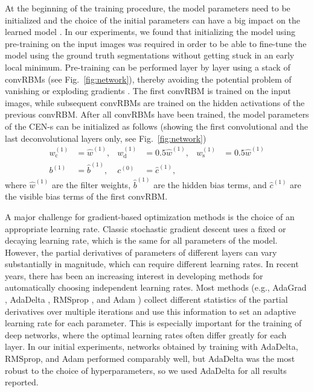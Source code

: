 At the beginning of the training procedure, the model parameters need to be
initialized and the choice of the initial parameters can have a big impact on
the learned model \cite{sutskever2013importance}. In our experiments, we found
that initializing the model using pre-training \cite{Hinton2006} on the input images was required in order
to be able to fine-tune the model using the ground truth segmentations without
getting stuck in an early local minimum. Pre-training can be performed layer by
layer \cite{Hinton2006b} using a stack of convRBMs (see Fig.~\ref{fig:network}),
thereby avoiding the potential problem of vanishing or exploding gradients
\cite{hochreiter1991untersuchungen}. The first convRBM is trained on the input
images, while subsequent convRBMs are trained on the hidden activations of the
previous convRBM. After all convRBMs have been trained, the model parameters of
the CEN-s can be initialized as follows (showing the first convolutional and
the last deconvolutional layers only, see Fig.~\ref{fig:network})
\begin{align}
w_{\text{c}}^{(1)} &= \hat{w}^{(1)}, &
w_{\text{d}}^{(1)} &= 0.5\hat{w}^{(1)}, &
w_{\text{s}}^{(1)} &= 0.5\hat{w}^{(1)} \\
b^{(1)} &= \hat{b}^{(1)}, &
c^{(0)} &= \hat{c}^{(1)},
\end{align}
where $\hat{w}^{(1)}$ are the filter weights, $\hat{b}^{(1)}$ are the hidden
bias terms, and $\hat{c}^{(1)}$ are the visible bias terms of the first convRBM.

A major challenge for gradient-based optimization methods is the choice of an
appropriate learning rate. Classic stochastic gradient descent \cite{LeCun1998}
uses a fixed or decaying learning rate, which is the same for all parameters of
the model. However, the partial derivatives of parameters of different layers
can vary substantially in magnitude, which can require different learning rates.
In recent years, there has been an increasing interest in developing methods for
automatically choosing independent learning rates. Most methods (e.g., AdaGrad
\cite{duchi2011adaptive}, AdaDelta \cite{zeiler2012adadelta}, RMSprop
\cite{dauphin2015rmsprop}, and Adam \cite{kingma2014adam}) collect different
statistics of the partial derivatives over multiple iterations and use this
information to set an adaptive learning rate for each parameter. This is
especially important for the training of deep networks, where the optimal
learning rates often differ greatly for each layer. In our initial experiments,
networks obtained by training with AdaDelta, RMSprop, and Adam performed
comparably well, but AdaDelta was the most robust to the choice of
hyperparameters, so we used AdaDelta for all results reported.


